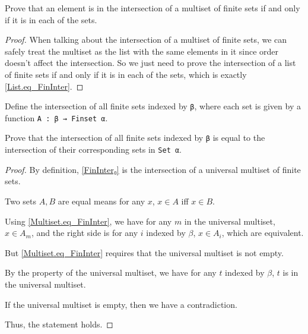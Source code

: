 \begin{lemma}\label{Multiset.eq_FinInter}
  \leanok
  Prove that an element is in the intersection of a multiset of finite sets if and only if it is in each of the sets.
\end{lemma}

\begin{proof}
  \leanok
  When talking about the intersection of a multiset of finite sets, we can safely treat the multiset as the list with the same elements in it since order doesn't affect the intersection. So we just need to prove the intersection of a list of finite sets if and only if it is in each of the sets, which is exactly \ref{List.eq_FinInter}.
\end{proof}

\begin{definition}\label{FinInter₀}
  \leanok
  Define the intersection of all finite sets indexed by \verb|β|, where each set is given by a function \verb|A : β → Finset α|.
\end{definition}

\begin{lemma}\label{eq_FinInter₀}
  \leanok
  Prove that the intersection of all finite sets indexed by \verb|β| is equal to the intersection of their corresponding sets in \verb|Set α|.
\end{lemma}

\begin{proof}
  \leanok
  By definition, \ref{FinInter₀} is the intersection of a universal multiset of finite sets.
  
  Two sets $A,B$ are equal means for any $x$, $x\in A$ iff $x\in B$.
  
  Using \ref{Multiset.eq_FinInter}, we have for any $m$ in the universal multiset, $x∈A_m$, and the right side is for any $i$ indexed by $β$, $x∈A_i$, which are equivalent.
  
  But \ref{Multiset.eq_FinInter} requires that the universal multiset is not empty.
  
  By the property of the universal multiset, we have for any $t$ indexed by $β$, $t$ is in the universal multiset.
  
  If the universal multiset is empty, then we have a contradiction.

  Thus, the statement holds.
\end{proof}

